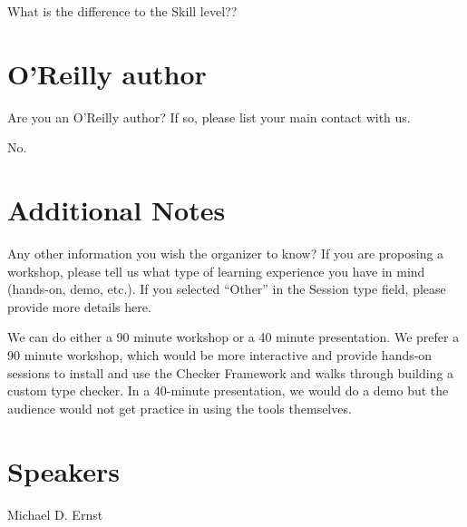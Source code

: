 \documentclass{article}
\begin{document}
What is the difference to the Skill level??


\section{O'Reilly author}

Are you an O'Reilly author? If so, please list your main contact with us.

\medskip

No.


\section{Additional Notes}

Any other information you wish the organizer to know? If you are
proposing a workshop, please tell us what type of learning experience
you have in mind (hands-on, demo, etc.). If you selected ``Other'' in
the Session type field, please provide more details here.

\medskip

We can do either a 90 minute workshop or a 40 minute presentation.  We
prefer a 90 minute workshop, which would be more interactive and provide
hands-on sessions to install and use the Checker Framework and walks
through building a custom type checker.  In a 40-minute presentation, we
would do a demo but the audience would not get practice in using the tools
themselves.


\section{Speakers}

Michael D. Ernst
\end{document}
